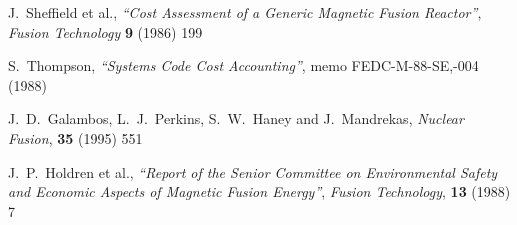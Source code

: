 \begin{thebibliography}{99}
J.\ Sheffield et al.,
{\it ``Cost Assessment of a Generic Magnetic Fusion Reactor''},
{\it Fusion Technology} {\bf 9} (1986) 199

S.\ Thompson,
{\it ``Systems Code Cost Accounting''},
memo FEDC-M-88-SE,-004
(1988)

J.\ D.\ Galambos, L.\ J.\ Perkins, S.\ W.\ Haney and J.\ Mandrekas,
\textit{Nuclear Fusion}, \textbf{35} (1995) 551

J.\ P.\ Holdren et al.,
{\it ``Report of the Senior Committee on Environmental Safety and
Economic Aspects of Magnetic Fusion Energy''},
{\it Fusion Technology}, {\bf 13} (1988) 7

\end{thebibliography}
